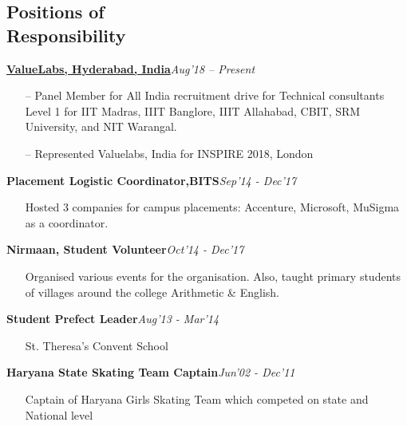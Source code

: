 \documentclass[margin,line]{templates/resume}
\newcommand{\compresslist}{%
\setlength{\itemsep}{3pt}%
\setlength{\parskip}{0pt}%
\setlength{\parsep}{0pt}%
}
\begin{document}
\begin{resume}
\section{\mysidestyle Positions of \\ Responsibility}
  \textbf{\href{https://www.valuelabs.com/}{ValueLabs, Hyderabad, India}}\hfill{\textit{Aug'18 -- Present}}
\begin{itemize}[leftmargin=*]\compresslist
\item[--]Panel Member for All India recruitment drive for Technical consultants Level 1 for IIT Madras, IIIT Banglore, IIIT Allahabad, CBIT, SRM University, and NIT Warangal.
\item[--]Represented Valuelabs, India for INSPIRE 2018, London
\end{itemize}
\vspace{-0.2cm}
  \textbf{Placement Logistic Coordinator,BITS}\hfill{\textit{Sep'14 - Dec'17}}
\begin{itemize}[leftmargin=*]\compresslist
\item[]Hosted 3 companies for campus placements: Accenture, Microsoft, MuSigma as a coordinator.
\end{itemize}
\vspace{-0.2cm}
  \textbf{Nirmaan, Student Volunteer}\hfill{\textit{Oct'14 - Dec'17}}
\begin{itemize}[leftmargin=*]\compresslist
\item[]Organised various events for the organisation. Also, taught primary students of villages around the college Arithmetic \&  English.
\end{itemize}
\vspace{-0.2cm}
  \textbf{Student Prefect Leader}\hfill{\textit{Aug'13 - Mar'14}}
 \begin{itemize}[leftmargin=*]\compresslist
\item[]St. Theresa's Convent School
\end{itemize}
\vspace{-0.2cm}
  \textbf{Haryana State Skating Team Captain}\hfill{\textit{Jun'02 - Dec'11}}
 \begin{itemize}[leftmargin=*]\compresslist
\item[]Captain of Haryana Girls Skating Team which competed on state and National level
\end{itemize}

\vspace{-0.1cm}    

\end{resume}
\end{document}
